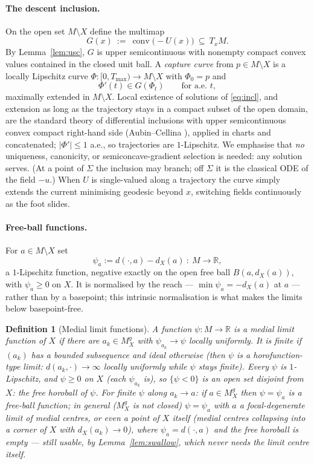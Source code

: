 \documentclass[11pt]{article}
\newtheorem{definition}[theorem]{Definition}
\theoremstyle{remark}
\newcommand{\R}{\mathbb{R}}
\newcommand{\X}{X}
\newcommand{\Mg}{M^{g}_{\X}}
\newcommand{\dX}{d_{\X}}
\newcommand{\conv}{\operatorname{conv}}
\begin{document}
\paragraph{The descent inclusion.} On the open set $M\setminus\X$
define the multimap
\[
  G(x)\ :=\ \conv\bigl(-U(x)\bigr)\ \subseteq\ T_{x}M .
\]
By Lemma~\ref{lem:usc}, $G$ is upper semicontinuous with nonempty
compact convex values contained in the closed unit ball. A
\emph{capture curve} from $p\in M\setminus\X$ is a locally Lipschitz
curve $\Phi:[0,T_{\max})\to M\setminus\X$ with $\Phi_{0}=p$ and
\begin{equation}\label{eq:incl}
  \Phi'(t)\in G(\Phi_{t})\qquad\text{for a.e.\ }t ,
\end{equation}
maximally extended in $M\setminus\X$. Local existence of solutions of
\eqref{eq:incl}, and extension as long as the trajectory stays in a
compact subset of the open domain, are the standard theory of
differential inclusions with upper semicontinuous convex compact
right-hand side (Aubin--Cellina \cite[\S2.1]{AC}), applied in charts
and concatenated; $|\Phi'|\le1$ a.e., so trajectories are
$1$-Lipschitz. We emphasise that \emph{no} uniqueness, canonicity, or
semiconcave-gradient selection is needed: any solution serves. (At a
point of $\Sigma$ the inclusion may branch; off $\Sigma$ it is the
classical ODE of the field $-u$.) When $U$ is single-valued along a
trajectory the curve simply extends the current minimising geodesic
beyond $x$, switching fields continuously as the foot slides.

\paragraph{Free-ball functions.} For $a\in M\setminus\X$ set
\[
  \psi_{a}:=d(\cdot,a)-\dX(a)\ :\ M\to\R ,
\]
a $1$-Lipschitz function, negative exactly on the open free ball
$B(a,\dX(a))$, with $\psi_{a}\ge0$ on $\X$. It is normalised by the
reach --- $\min\psi_{a}=-\dX(a)$ at $a$ --- rather than by a basepoint;
this intrinsic normalisation is what makes the limits below
basepoint-free.

\begin{definition}[Medial limit functions]\label{def:mlf}
A function $\psi:M\to\R$ is a \emph{medial limit function} of $\X$ if
there are $a_{k}\in\Mg$ with $\psi_{a_{k}}\to\psi$ locally uniformly.
It is \emph{finite} if $(a_{k})$ has a bounded subsequence and
\emph{ideal} otherwise (then $\psi$ is a horofunction-type limit:
$d(a_{k},\cdot)\to\infty$ locally uniformly while
$\psi$ stays finite). Every $\psi$ is $1$-Lipschitz, and
$\psi\ge0$ on $\X$ (each $\psi_{a_{k}}$ is), so $\{\psi<0\}$ is an open
set disjoint from $\X$: the \emph{free horoball} of $\psi$. For finite
$\psi$ along $a_{k}\to a$: if $a\in\Mg$ then $\psi=\psi_{a}$ is a
free-ball function; in general ($\Mg$ is not closed) $\psi=\psi_{a}$
with $a$ a focal-degenerate limit of medial centres, or even a point
of $\X$ itself (medial centres collapsing into a corner of $\X$ with
$\dX(a_{k})\to0$), where $\psi_{a}=d(\cdot,a)$ and the free horoball
is empty --- still usable, by Lemma~\ref{lem:swallow}, which never
needs the limit centre itself.
\end{definition}
\end{document}

